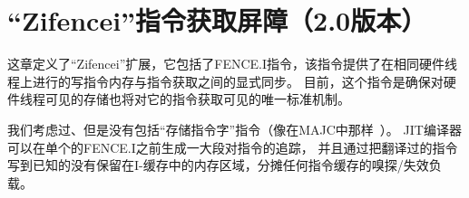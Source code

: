 \chapter{“Zifencei”指令获取屏障（2.0版本）}
\label{chap:zifencei}

这章定义了“Zifencei”扩展，它包括了FENCE.I指令，该指令提供了在相同硬件线程上进行的写指令内存与指令获取之间的显式同步。
目前，这个指令是确保对硬件线程可见的存储也将对它的指令获取可见的唯一标准机制。

\begin{commentary}
我们考虑过、但是没有包括“存储指令字”指令（像在MAJC中那样~\cite{majc}）。
JIT编译器可以在单个的FENCE.I之前生成一大段对指令的追踪，
并且通过把翻译过的指令写到已知的没有保留在I-缓存中的内存区域，分摊任何指令缓存的嗅探/失效负载。
\end{commentary}

